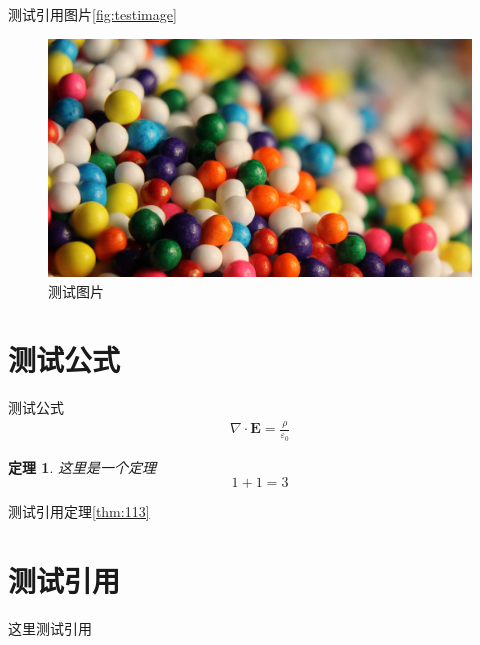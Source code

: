 \documentclass[a4paper,oneside,UTF8]{ctexart} %
\newtheorem{theorem}{定理}[section]
\begin{document}
测试引用图片\autoref{fig:testimage}
\begin{figure}
    \centering
    \includegraphics[width=1.0\linewidth]{figure_example1.jpg}
    \caption{\kaishu{}测试图片}
    \label{fig:testimage}
\end{figure}

\section{测试公式}
测试公式
$$
\begin{aligned}
    \nabla \cdot \boldsymbol{E}=\frac{\rho}{\varepsilon_0}
\end{aligned}
$$

\begin{theorem}
    这里是一个定理
    $$
    1 + 1 = 3
    $$
    \label{thm:113}
\end{theorem}

测试引用定理\autoref{thm:113}
\section{测试引用}

这里测试引用\cite{dai2022explicit}

\printbibliography
\end{document}
